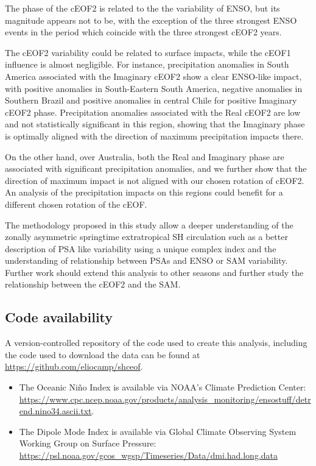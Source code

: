 \documentclass[smallextended]{svjour3}       %
\begin{document}
The phase of the cEOF2 is related to the the variability of ENSO, but its magnitude appears not to be, with the exception of the three strongest ENSO events in the period which coincide with the three strongest cEOF2 years.

The cEOF2 variability could be related to surface impacts, while the cEOF1 influence is almost negligible.
For instance, precipitation anomalies in South America associated with the Imaginary cEOF2 show a clear ENSO-like impact, with positive anomalies in South-Eastern South America, negative anomalies in Southern Brazil and positive anomalies in central Chile for positive Imaginary cEOF2 phase.
Precipitation anomalies associated with the Real cEOF2 are low and not statistically significant in this region, showing that the Imaginary phase is optimally aligned with the direction of maximum precipitation impacts there.

On the other hand, over Australia, both the Real and Imaginary phase are associated with significant precipitation anomalies, and we further show that the direction of maximum impact is not aligned with our chosen rotation of cEOF2.
An analysis of the precipitation impacts on this regions could benefit for a different chosen rotation of the cEOF.

The methodology proposed in this study allow a deeper understanding of the zonally asymmetric springtime extratropical SH circulation such as a better description of PSA like variability using a unique complex index and the understanding of relationship between PSAs and ENSO or SAM variability.
Further work should extend this analysis to other seasons and further study the relationship between the cEOF2 and the SAM.

\hypertarget{code-availability}{%
\subsection*{Code availability}\label{code-availability}}

A version-controlled repository of the code used to create this analysis, including the code used to download the data can be found at \url{https://github.com/eliocamp/shceof}.

\begin{itemize}
\item
  The Oceanic Niño Index is available via NOAA's Climate Prediction Center: \url{https://www.cpc.ncep.noaa.gov/products/analysis_monitoring/ensostuff/detrend.nino34.ascii.txt}.
\item
  The Dipole Mode Index is available via Global Climate Observing System Working Group on Surface Pressure: \url{https://psl.noaa.gov/gcos_wgsp/Timeseries/Data/dmi.had.long.data}
\end{itemize}
\end{document}
